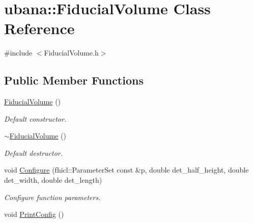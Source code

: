 \hypertarget{classubana_1_1FiducialVolume}{\section{ubana\-:\-:Fiducial\-Volume Class Reference}
\label{classubana_1_1FiducialVolume}
}


{\ttfamily \#include $<$Fiducial\-Volume.\-h$>$}

\subsection*{Public Member Functions}
\begin{DoxyCompactItemize}
\item 
\hypertarget{classubana_1_1FiducialVolume_a557d2e3c2d7b6151ea0156685bf56d00}{\hyperlink{classubana_1_1FiducialVolume_a557d2e3c2d7b6151ea0156685bf56d00}{Fiducial\-Volume} ()}\label{classubana_1_1FiducialVolume_a557d2e3c2d7b6151ea0156685bf56d00}

\begin{DoxyCompactList}\small\item\em Default constructor. \end{DoxyCompactList}\item 
\hypertarget{classubana_1_1FiducialVolume_adf150e608c658207370667f6130947a6}{\hyperlink{classubana_1_1FiducialVolume_adf150e608c658207370667f6130947a6}{$\sim$\-Fiducial\-Volume} ()}\label{classubana_1_1FiducialVolume_adf150e608c658207370667f6130947a6}

\begin{DoxyCompactList}\small\item\em Default destructor. \end{DoxyCompactList}\item 
\hypertarget{classubana_1_1FiducialVolume_a1a7d659cde6b1f4b661ca21df6677fd9}{void \hyperlink{classubana_1_1FiducialVolume_a1a7d659cde6b1f4b661ca21df6677fd9}{Configure} (fhicl\-::\-Parameter\-Set const \&p, double det\-\_\-half\-\_\-height, double det\-\_\-width, double det\-\_\-length)}\label{classubana_1_1FiducialVolume_a1a7d659cde6b1f4b661ca21df6677fd9}

\begin{DoxyCompactList}\small\item\em Configure function parameters. \end{DoxyCompactList}\item 
\hypertarget{classubana_1_1FiducialVolume_a852522fe049681771c7ca9d66f8f8049}{void \hyperlink{classubana_1_1FiducialVolume_a852522fe049681771c7ca9d66f8f8049}{Print\-Config} ()}\label{classubana_1_1FiducialVolume_a852522fe049681771c7ca9d66f8f8049}


\end{DoxyCompactItemize}
